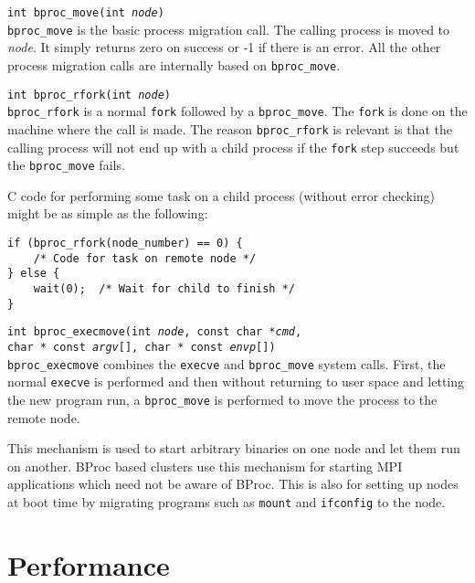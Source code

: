 \begin{description}

\item{\texttt{int bproc\_move(int \emph{node})}}\\
\texttt{bproc\_move} is the basic process migration call.  The calling
process is moved to \emph{node}.  It simply returns zero on success or
-1 if there is an error.  All the other process migration calls are
internally based on \texttt{bproc\_move}.

\item{\texttt{int bproc\_rfork(int \emph{node})}}\\
\texttt{bproc\_rfork} is a normal \texttt{fork} followed by a
\texttt{bproc\_move}.  The \texttt{fork} is done on the machine where
the call is made.  The reason \texttt{bproc\_rfork} is relevant is
that the calling process will not end up with a child process if the
\texttt{fork} step succeeds but the \texttt{bproc\_move} fails.

C code for performing some task on a child process (without error
checking) might be as simple as the following:

\begin{verbatim}
if (bproc_rfork(node_number) == 0) {
    /* Code for task on remote node */
} else {
    wait(0);  /* Wait for child to finish */
}
\end{verbatim}

\item{\texttt{int bproc\_execmove(int \emph{node}, const char *\emph{cmd},\\
	 char * const \emph{argv}[], char * const \emph{envp}[])}}\\

\texttt{bproc\_execmove} combines the \texttt{execve} and
\texttt{bproc\_move} system calls.  First, the normal \texttt{execve}
is performed and then without returning to user space and letting the
new program run, a \texttt{bproc\_move} is performed to move the
process to the remote node.

This mechanism is used to start arbitrary binaries on one node and let
them run on another.  BProc based clusters use this mechanism for
starting MPI applications which need not be aware of BProc.  This is
also for setting up nodes at boot time by migrating programs such as
\texttt{mount} and \texttt{ifconfig} to the node.
\end{description}

\section{Performance}

